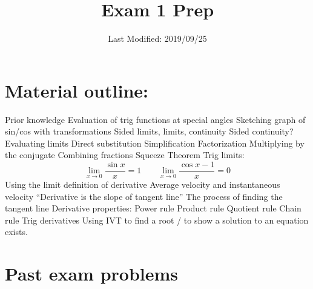 \documentclass[11pt]{scrartcl}
\title{Exam 1 Prep}
\date{Last Modified: 2019/09/25}
\author{}
\begin{document}
\maketitle
\tableofcontents


\section{Material outline:}
\begin{outline}
  \1 Prior knowledge
  \2 Evaluation of trig functions at special angles
  \2 Sketching graph of sin/cos with transformations
  \1 Sided limits, limits, continuity
  \1 Sided continuity?
  \1 Evaluating limits
  \2 Direct substitution
  \2 Simplification
  \3 Factorization
  \3 Multiplying by the conjugate
  \3 Combining fractions
  \2 Squeeze Theorem
  \2 Trig limits:
  \[
    \lim_{x\to0} \frac{\sin x}{x} = 1 \qquad \lim_{x\to0} \frac{\cos x - 1}{x} = 0
  \]
  \1 Using the limit definition of derivative
  \1 Average velocity and instantaneous velocity
  \1 ``Derivative is the slope of tangent line''
  \1 The process of finding the tangent line
  \1 Derivative properties:
  \2 Power rule
  \2 Product rule
  \2 Quotient rule
  \2 Chain rule
  \2 Trig derivatives
  \1 Using IVT to find a root / to show a solution to an equation exists.
\end{outline}

\section{Past exam problems}
\end{document}
